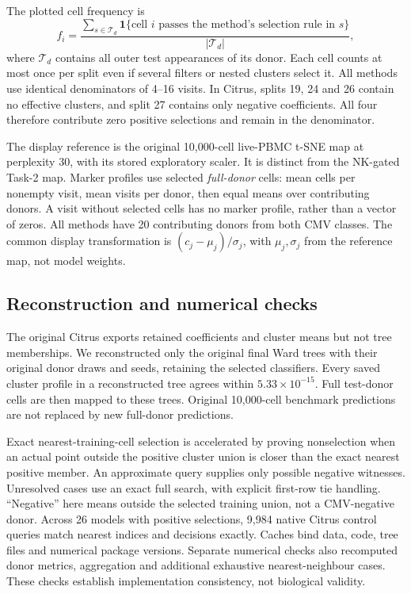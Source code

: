 \documentclass[11pt,a4paper]{article}
\begin{document}
The plotted cell frequency is
\[
f_i=\frac{\sum_{s\in\mathcal T_d}\mathbf1\{\text{cell }i\text{ passes the method's selection rule in }s\}}
{|\mathcal T_d|},
\]
where $\mathcal T_d$ contains all outer test appearances of its donor. Each cell counts at most once per split even if several filters or nested clusters select it. All methods use identical denominators of 4--16 visits. In Citrus, splits 19, 24 and 26 contain no effective clusters, and split 27 contains only negative coefficients. All four therefore contribute zero positive selections and remain in the denominator.

The display reference is the original 10,000-cell live-PBMC t-SNE map at perplexity 30, with its stored exploratory scaler. It is distinct from the NK-gated Task-2 map. Marker profiles use selected \emph{full-donor} cells: mean cells per nonempty visit, mean visits per donor, then equal means over contributing donors. A visit without selected cells has no marker profile, rather than a vector of zeros. All methods have 20 contributing donors from both CMV classes. The common display transformation is $(c_j-\mu_j)/\sigma_j$, with $\mu_j,\sigma_j$ from the reference map, not model weights.

\subsection{Reconstruction and numerical checks}
The original Citrus exports retained coefficients and cluster means but not tree memberships. We reconstructed only the original final Ward trees with their original donor draws and seeds, retaining the selected classifiers. Every saved cluster profile in a reconstructed tree agrees within $5.33\times10^{-15}$. Full test-donor cells are then mapped to these trees. Original 10,000-cell benchmark predictions are not replaced by new full-donor predictions.

Exact nearest-training-cell selection is accelerated by proving nonselection when an actual point outside the positive cluster union is closer than the exact nearest positive member. An approximate query supplies only possible negative witnesses. Unresolved cases use an exact full search, with explicit first-row tie handling. ``Negative'' here means outside the selected training union, not a CMV-negative donor. Across 26 models with positive selections, 9,984 native Citrus control queries match nearest indices and decisions exactly. Caches bind data, code, tree files and numerical package versions. Separate numerical checks also recomputed donor metrics, aggregation and additional exhaustive nearest-neighbour cases. These checks establish implementation consistency, not biological validity.
\end{document}
